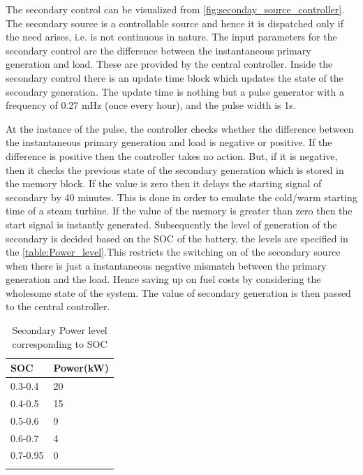 The secondary control can be visualized from \ref{fig:seconday_source_controller}.
\noindent The secondary source is a controllable source and hence it is dispatched only if the need arises, i.e. is not continuous in nature. The input parameters for the secondary control are the difference between the instantaneous primary generation and load. These are provided by the central controller. Inside the secondary control there is an update time block which updates the state of the secondary generation. The update time is nothing but a pulse generator with a frequency of 0.27 mHz (once every hour), and the pulse width is 1s.

\noindent At the instance of the pulse, the controller checks whether the difference between the instantaneous primary generation and load is negative or positive. If the difference is positive then the controller takes no action. But, if it is negative, then it checks the previous state of the secondary generation which is stored in the memory block. If the value is zero then it delays the starting signal of secondary by 40 minutes. This is done in order to emulate the cold/warm starting time of a steam turbine. If the value of the memory is greater than zero then the start signal is instantly generated. 
Subsequently the level of generation of the secondary is decided based on the SOC of the battery, the levels are specified in the \ref{table:Power_level}.This restricts the switching on of the secondary source when there is just a instantaneous negative mismatch between the primary generation and the load. Hence saving up on fuel costs by considering the wholesome state of the system. The value of secondary generation is then passed to the central controller.
\begin{table}[h]
\centering
\caption{Secondary Power level corresponding to SOC}
\begin{tabular}{|l|l|} 
\hline
SOC                  & Power(kW)             \\ 
\hline
0.3-0.4              & 20                    \\ 
\hline
0.4-0.5              & 15                    \\ 
\hline
0.5-0.6              & 9                     \\ 
\hline
0.6-0.7              & 4                     \\ 
\hline
0.7-0.95             & 0                     \\ 
\hline
\multicolumn{1}{l}{} & \multicolumn{1}{l}{} 
\end{tabular}
\end{table}\label{table:Power_level}
